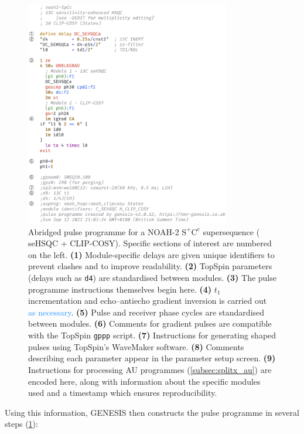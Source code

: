 \documentclass[a4paper,11pt]{article}
\newcommand{\carbon}{\ch{^{13}C}}
\newcommand{\changed}[1]{\textcolor{DodgerBlue}{#1}}
\begin{document}
\begin{refsection}
\begin{figure}
    \centering
    \includegraphics[width=0.8\textwidth]{pulprog_code.png}
    \caption{
        Abridged pulse programme for a NOAH-2 \(\mathrm{S^+C^c}\) supersequence (\carbon{} seHSQC + CLIP-COSY).
        Specific sections of interest are numbered on the left.
        \textbf{(1)} Module-specific delays are given unique identifiers to prevent clashes and to improve readability.
        \textbf{(2)} TopSpin parameters (delays such as \texttt{d4}) are standardised between modules.
        \textbf{(3)} The pulse programme instructions themselves begin here.
        \textbf{(4)} \(t_1\) incrementation and echo--antiecho gradient inversion is carried out \changed{as necessary}.
        \textbf{(5)} Pulse and receiver phase cycles are standardised between modules.
        \textbf{(6)} Comments for gradient pulses are compatible with the TopSpin \texttt{gppp} script.
        \textbf{(7)} Instructions for generating shaped pulses using TopSpin's WaveMaker software.
        \textbf{(8)} Comments describing each parameter appear in the parameter setup screen.
        \textbf{(9)} Instructions for processing AU programmes (\cref{subsec:splitx_au}) are encoded here, along with information about the specific modules used and a timestamp which ensures reproducibility.
    }
    \label{fig:pulprog_code}
\end{figure}

Using this information, GENESIS then constructs the pulse programme in several steps (\cref{fig:pulprog_code}):


\end{refsection}
\end{document}
